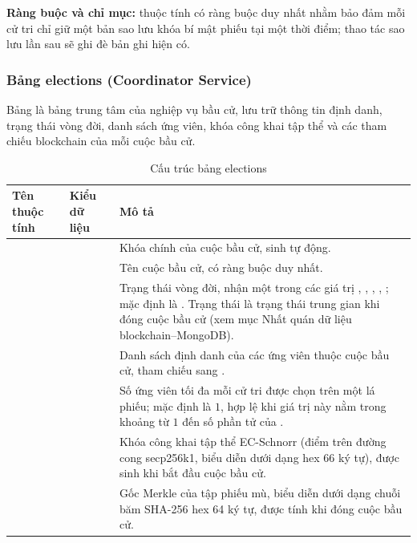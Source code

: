 \textbf{Ràng buộc và chỉ mục:} thuộc tính  có ràng buộc duy nhất nhằm bảo đảm mỗi cử tri chỉ giữ một bản sao lưu khóa bí mật phiếu tại một thời điểm; thao tác sao lưu lần sau sẽ ghi đè bản ghi hiện có.

\subsubsection{Bảng elections (Coordinator Service)}

Bảng  là bảng trung tâm của nghiệp vụ bầu cử, lưu trữ thông tin định danh, trạng thái vòng đời, danh sách ứng viên, khóa công khai tập thể và các tham chiếu blockchain của mỗi cuộc bầu cử.

\begin{table}[H]
    \centering
    \small
    \setlength{\tabcolsep}{3pt}
    \caption{Cấu trúc bảng elections}
    \label{tab:db-elections}
    \begin{tabularx}{\textwidth}{|L{0.25}|L{0.25}|L{0.50}|}
    \hline
    \textbf{Tên thuộc tính} & \textbf{Kiểu dữ liệu} & \textbf{Mô tả} \\
    \hline
                      &   & Khóa chính của cuộc bầu cử, sinh tự động. \\ \hline
                    &     & Tên cuộc bầu cử, có ràng buộc duy nhất. \\ \hline
                  & \allowbreak{} & Trạng thái vòng đời, nhận một trong các giá trị , , , , ; mặc định là . Trạng thái  là trạng thái trung gian khi đóng cuộc bầu cử (xem mục Nhất quán dữ liệu blockchain--MongoDB). \\ \hline
            &   & Danh sách định danh của các ứng viên thuộc cuộc bầu cử, tham chiếu sang . \\ \hline
    \allowbreak{} &  & Số ứng viên tối đa mỗi cử tri được chọn trên một lá phiếu; mặc định là $1$, hợp lệ khi giá trị này nằm trong khoảng từ $1$ đến số phần tử của . \\ \hline
    \allowbreak{} &    & Khóa công khai tập thể EC-Schnorr (điểm trên đường cong secp256k1, biểu diễn dưới dạng hex 66 ký tự), được sinh khi bắt đầu cuộc bầu cử. \\ \hline
              &    & Gốc Merkle của tập phiếu mù, biểu diễn dưới dạng chuỗi băm SHA-256 hex 64 ký tự, được tính khi đóng cuộc bầu cử. \\ \hline

\end{tabularx}
\end{table}
